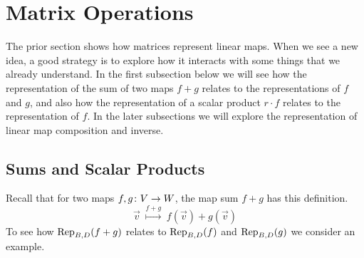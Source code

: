 \section{Matrix Operations}
The prior section shows how matrices represent linear maps.
When we see a new idea, a good strategy  
is to explore how it interacts with some things
that we already understand.
In the first subsection below we will see how the representation of the 
sum of two maps $f+g$ relates to the representations of $f$ and $g$, and
also how the representation of a scalar product $r\cdot f$ relates 
to the representation of $f$.
In the later subsections we will explore the representation of 
linear map composition and inverse.




\subsection{Sums and Scalar Products}
Recall that for two maps $\map{f,g}{V}{W}$, 
the map sum $f+g$ has this definition.
\begin{equation*}
  \vec{v} \;\stackrel{f+g}{\longmapsto}\; f(\vec{v})+g(\vec{v})
\end{equation*}
To see how $\rep{f+g}{B,D}$ relates to 
$\rep{f}{B,D}$ and $\rep{g}{B,D}$ we consider
an example.

